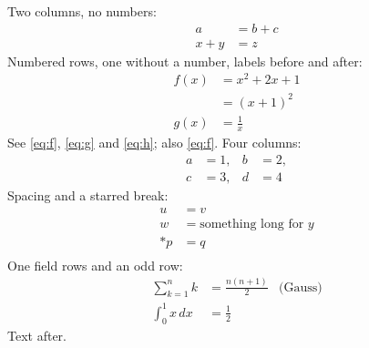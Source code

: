 \documentclass{article}
\begin{document}
Two columns, no numbers:
\begin{align*}
a &= b + c \\
x + y &= z
\end{align*}
Numbered rows, one without a number, labels before and after:
\begin{align}
f(x) &= x^2 + 2x + 1 \label{eq:f} \\
     &= (x+1)^2 \nonumber \\
g(x) &= \frac{1}{x} \label{eq:g}
\end{align}
See \eqref{eq:f}, \eqref{eq:g} and \eqref{eq:h}; also \ref{eq:f}.
Four columns:
\begin{align}
a &= 1, & b &= 2, \\
c &= 3, & d &= 4 \label{eq:h}
\end{align}
Spacing and a starred break:
\begin{align}
u &= v \\[2pt]
w &= \text{something long for } y \\*
p &= q \\
\end{align}
One field rows and an odd row:
\begin{align}
\sum_{k=1}^{n} k &= \frac{n(n+1)}{2} & \text{(Gauss)} \\
\int_0^1 x\,dx &= \frac12
\end{align}
Text after.
\end{document}
